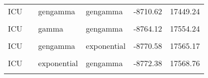 \begin{table}[!h]
\begin{tabular}[t]{llllrr}
ICU &  & gengamma & gengamma & -8710.62 & 17449.24\\
\cellcolor{gray!10}{ICU} & \cellcolor{gray!10}{} & \cellcolor{gray!10}{log-normal} & \cellcolor{gray!10}{gengamma} & \cellcolor{gray!10}{-8717.79} & \cellcolor{gray!10}{17461.59}\\
ICU &  & gamma & gengamma & -8764.12 & 17554.24\\
\cellcolor{gray!10}{ICU} & \cellcolor{gray!10}{} & \cellcolor{gray!10}{gengamma} & \cellcolor{gray!10}{gamma} & \cellcolor{gray!10}{-8765.89} & \cellcolor{gray!10}{17557.78}\\
ICU &  & gengamma & exponential & -8770.58 & 17565.17\\
\cellcolor{gray!10}{ICU} & \cellcolor{gray!10}{} & \cellcolor{gray!10}{gengamma} & \cellcolor{gray!10}{Weibull} & \cellcolor{gray!10}{-8769.90} & \cellcolor{gray!10}{17565.80}\\
ICU &  & exponential & gengamma & -8772.38 & 17568.76\\
\cellcolor{gray!10}{ICU} & \cellcolor{gray!10}{} & \cellcolor{gray!10}{Weibull} & \cellcolor{gray!10}{gengamma} & \cellcolor{gray!10}{-8772.14} & \cellcolor{gray!10}{17570.28}\\
\bottomrule
\end{tabular}
\end{table}
